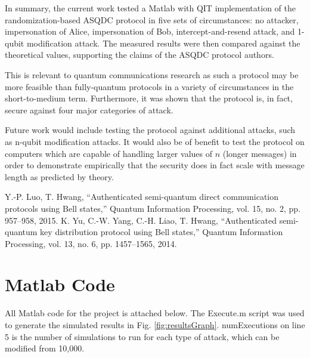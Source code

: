 \documentclass[conference]{IEEEtran}
\begin{document}
In summary, the current work tested a Matlab with QIT implementation
of the randomization-based ASQDC protocol in five sets of circumstances:
no attacker, impersonation of Alice, impersonation of Bob, intercept-and-resend
attack, and 1-qubit modification attack. The measured results were
then compared against the theoretical values, supporting the claims
of the ASQDC protocol authors.

This is relevant to quantum communications research as such a protocol
may be more feasible than fully-quantum protocols in a variety of
circumstances in the short-to-medium term. Furthermore, it was shown
that the protocol is, in fact, secure against four major categories
of attack.

Future work would include testing the protocol against additional
attacks, such as n-qubit modification attacks. It would also be of
benefit to test the protocol on computers which are capable of handling
larger values of $n$ (longer messages) in order to demonstrate empirically
that the security does in fact scale with message length as predicted
by theory.

\begin{thebibliography}{00}
 Y.-P. Luo, T. Hwang, ``Authenticated semi-quantum direct communication protocols using Bell states,'' Quantum Information Processing, vol. 15, no. 2, pp. 957--958, 2015.
 K. Yu, C.-W. Yang, C.-H. Liao, T. Hwang, ``Authenticated semi-quantum key distribution protocol using Bell states,'' Quantum Information Processing, vol. 13, no. 6, pp. 1457--1565, 2014.
\end{thebibliography}
\vspace{12pt}

\appendix
\section{Matlab Code}
All Matlab code for the project is attached below. The {\ttfamily Execute.m} script was used to generate the simulated results in Fig. \ref{fig:resultsGraph}.
{\ttfamily numExecutions} on line 5 is the number of simulations to run for each type of attack, which can be modified from 10,000.

\onecolumn
{}






\end{document}
